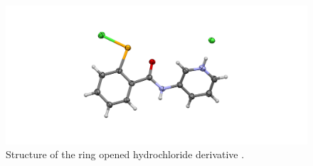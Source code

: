 \begin{refsection}
\begin{figure}
    \centering
    \includegraphics[width=0.6\linewidth]{Figures/3py-ebs-hcl.pdf}
    \caption{Structure of the ring opened hydrochloride derivative .}
    \label{fig:3py-ebs-hcl}
\end{figure}

\end{refsection}

